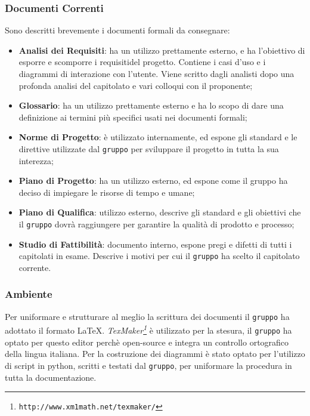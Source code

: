 \subsubsection{Documenti Correnti}
Sono descritti brevemente i documenti formali da consegnare:
\begin{itemize}
	\item \textbf{Analisi dei Requisiti}: ha un utilizzo prettamente esterno, e ha l'obiettivo di esporre e scomporre i requisiti\glossario del progetto. Contiene i casi d'uso e i diagrammi di interazione con l'utente. Viene scritto dagli analisti dopo una profonda analisi del capitolato e vari colloqui con il proponente; 
	\item \textbf{Glossario}: ha un utilizzo prettamente esterno e ha lo scopo di dare una definizione ai termini più specifici usati nei documenti formali;
	\item \textbf{Norme di Progetto}: è utilizzato internamente, ed espone gli standard e le direttive utilizzate dal \texttt{gruppo} per sviluppare il progetto in tutta la sua interezza;
	\item \textbf{Piano di Progetto}: ha un utilizzo esterno, ed espone come il gruppo ha deciso di impiegare le risorse di tempo e umane;
	\item \textbf{Piano di Qualifica}: utilizzo esterno, descrive gli standard e gli obiettivi che il \texttt{gruppo} dovrà raggiungere per garantire la qualità di prodotto e processo;
	\item \textbf{Studio di Fattibilità}: documento interno, espone pregi e difetti di tutti i capitolati in esame. Descrive i motivi per cui il \texttt{gruppo} ha scelto il capitolato corrente.
\end{itemize}

\subsubsection{Ambiente}
Per uniformare e strutturare al meglio la scrittura dei documenti il \texttt{gruppo} ha adottato il formato \LaTeX. 
\textit{TexMaker\footnote{\texttt{http://www.xm1math.net/texmaker/}}} è utilizzato per la stesura, il \texttt{gruppo} ha optato per questo editor perchè open-source e integra un controllo ortografico della lingua italiana. 
Per la costruzione dei diagrammi è stato optato per l'utilizzo di script in python, scritti e testati dal \texttt{gruppo}, per uniformare la procedura in tutta la documentazione.





